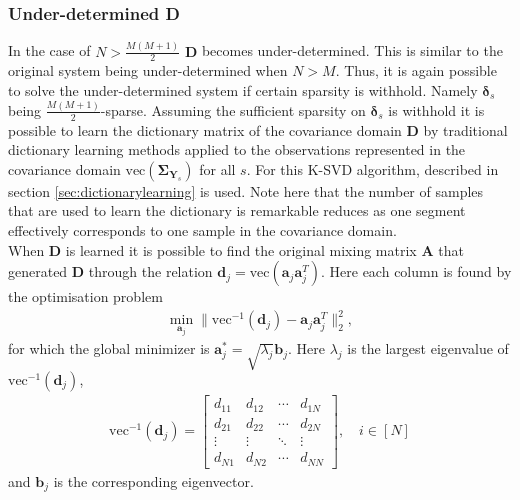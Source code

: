\subsubsection*{Under-determined \textbf{D}}
In the case of $N > \frac{M(M+1)}{2}$ $\textbf{D}$ becomes under-determined. This is  similar to the original system being under-determined when $N>M$. 
Thus, it is again possible to solve the under-determined system if certain sparsity is withhold. Namely $\boldsymbol{\delta}_s$ being $\frac{M(M+1)}{2}$-sparse.
Assuming the sufficient sparsity on $\boldsymbol{\delta}_s$ is withhold it is possible to learn the dictionary matrix of the covariance domain $\mathbf{D}$ by traditional dictionary learning methods applied to the observations represented in the covariance domain $\text{vec}(\boldsymbol{\Sigma}_{\mathbf{Y}_s})$ for all $s$.
For this K-SVD algorithm, described in section \ref{sec:dictionarylearning} is used. 
Note here that the number of samples that are used to learn the dictionary is remarkable reduces as one segment effectively corresponds to one sample in the covariance domain.  \\ 
When $\mathbf{D}$ is learned it is possible to find the original mixing matrix $\mathbf{A}$ that generated $\textbf{D}$ through the relation $\mathbf{d}_j = \text{vec}(\mathbf{a}_j \mathbf{a}_j^T)$. Here each column is found by the optimisation problem 
\begin{align*}
\min_{\textbf{a}_j} \| \text{vec}^{-1}(\textbf{d}_j) -\textbf{a}_j\textbf{a}_j^T\|_2^2, 
\end{align*}
for which the global minimizer is $\mathbf{a}^{\ast}_j=\sqrt{\lambda_j} \textbf{b}_j$. Here $\lambda_j$ is the largest eigenvalue of $\text{vec}^{-1}(\textbf{d}_j)$,
\begin{align*}
\text{vec}^{-1}(\textbf{d}_j) = 
\begin{bmatrix}
d_{11} & d_{12} & \cdots & d_{1N} \\
d_{21} & d_{22} & \cdots & d_{2N} \\
\vdots & \vdots & \ddots & \vdots \\
d_{N1} & d_{N2} & \cdots & d_{NN}
\end{bmatrix}, \quad i \in [N]
\end{align*}
and $\textbf{b}_j$ is the corresponding eigenvector.

